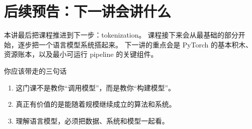 \section{后续预告：下一讲会讲什么}

本讲最后把课程推进到下一步：tokenization。
课程接下来会从最基础的部分开始，逐步把一个语言模型系统搭起来。
下一讲的重点会是 PyTorch 的基本积木、资源账本，以及最小可运行 pipeline 的关键组件。

\begin{warningbox}{你应该带走的三句话}
\begin{enumerate}
    \item 这门课不是教你“调用模型”，而是教你“构建模型”。
    \item 真正有价值的是能随着规模继续成立的算法和系统。
    \item 理解语言模型，必须把数据、系统和模型一起看。
\end{enumerate}
\end{warningbox}

